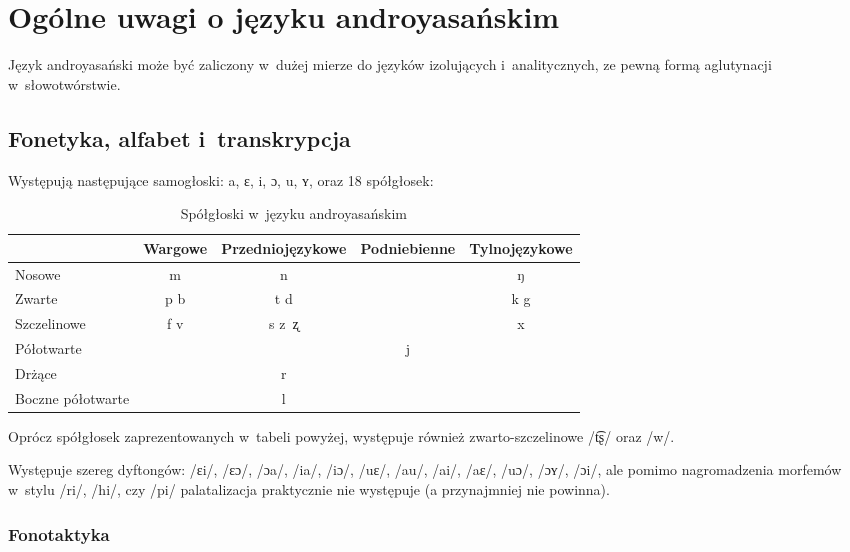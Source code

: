 \section[Ogólne uwagi]{Ogólne uwagi o języku androyasańskim}

\begin{spacing}{1.1}
Język androyasański może być zaliczony w~dużej mierze do języków 
izolujących i~analitycznych, ze pewną formą aglutynacji w~słowotwórstwie.

\subsection{Fonetyka, alfabet i~transkrypcja}

Występują następujące samogłoski: a, ɛ, i, ɔ, u, ʏ, oraz 18 spółgłosek:

\begin{table}[h]
\centering
\caption{Spółgłoski w~języku androyasańskim}
\begin{tabular}{lcccc}\toprule
                  & Wargowe & Przedniojęzykowe & Podniebienne & Tylnojęzykowe \\\midrule
Nosowe            & m       & n                &              & ŋ             \\\midrule
Zwarte            & p b     & t d              &              & k g           \\\midrule
Szczelinowe       & f v     & s z~ʐ            &              & x             \\\midrule
Półotwarte        &         &                  & j            &               \\\midrule
Drżące            &         & r                &              &               \\\midrule
Boczne półotwarte &         & l                &              &               \\\bottomrule
\end{tabular}
\label{tab:consonants}
\end{table}

Oprócz spółgłosek zaprezentowanych w~tabeli powyżej, występuje 
również zwarto-szczelinowe /t͡ʂ/ oraz /w/.

Występuje szereg dyftongów: /ɛi/, /ɛɔ/, /ɔa/, /ia/, /iɔ/, /uɛ/, /au/, /ai/, 
/aɛ/, /uɔ/, /ɔʏ/, /ɔi/, ale pomimo nagromadzenia morfemów w~stylu /ri/, /hi/, 
czy /pi/ palatalizacja praktycznie nie występuje (a przynajmniej nie powinna).

\subsubsection{Fonotaktyka}


\end{spacing}
